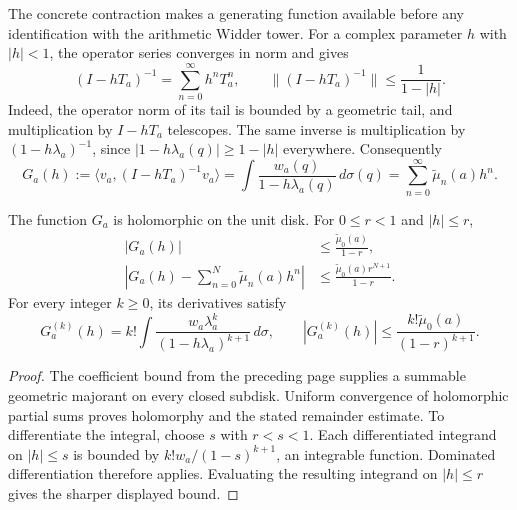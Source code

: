 \label{front:disk}

The concrete contraction makes a generating function available before any
identification with the arithmetic Widder tower. For a complex parameter
$h$ with $|h|<1$, the operator series converges in norm and gives
\begin{equation}
 (I-hT_a)^{-1}=\sum_{n=0}^{\infty}h^nT_a^n,\qquad
 \|(I-hT_a)^{-1}\|\leq\frac1{1-|h|}.
\end{equation}
Indeed, the operator norm of its tail is bounded by a geometric tail,
and multiplication by $I-hT_a$ telescopes. The same inverse is
multiplication by $(1-h\lambda_a)^{-1}$, since
$|1-h\lambda_a(q)|\geq1-|h|$ everywhere. Consequently
\begin{equation}
 G_a(h):=\langle v_a,(I-hT_a)^{-1}v_a\rangle
 =\int\frac{w_a(q)}{1-h\lambda_a(q)}\,d\sigma(q)
 =\sum_{n=0}^{\infty}\widetilde\mu_n(a)h^n.
\end{equation}

\begin{proposition}\label{front:disk-estimates}
The function $G_a$ is holomorphic on the unit disk. For $0\leq r<1$
and $|h|\leq r$,
\begin{align}
 |G_a(h)|&\leq\frac{\widetilde\mu_0(a)}{1-r},\nonumber\\
 \left|G_a(h)-\sum_{n=0}^{N}\widetilde\mu_n(a)h^n\right|
 &\leq\frac{\widetilde\mu_0(a)r^{N+1}}{1-r}.
\end{align}
For every integer $k\geq0$, its derivatives satisfy
\begin{equation}
 G_a^{(k)}(h)=k!\int
 \frac{w_a\lambda_a^k}{(1-h\lambda_a)^{k+1}}\,d\sigma,
 \qquad |G_a^{(k)}(h)|\leq
 \frac{k!\widetilde\mu_0(a)}{(1-r)^{k+1}}.
\end{equation}
\end{proposition}
\begin{proof}
The coefficient bound from the preceding page supplies a summable
geometric majorant on every closed subdisk. Uniform convergence of
holomorphic partial sums proves holomorphy and the stated remainder
estimate. To differentiate the integral, choose $s$ with $r<s<1$.
Each differentiated integrand on $|h|\leq s$ is bounded by
$k!w_a/(1-s)^{k+1}$, an integrable function. Dominated differentiation
therefore applies. Evaluating the resulting integrand on $|h|\leq r$
gives the sharper displayed bound.
\end{proof}

